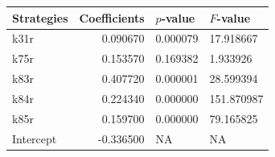 \begin{tabular}{lrll}
\toprule
Strategies & Coefficients & $p$-value & $F$-value \\
\midrule
k31r & 0.090670 & 0.000079 & 17.918667 \\
k75r & 0.153570 & 0.169382 & 1.933926 \\
k83r & 0.407720 & 0.000001 & 28.599394 \\
k84r & 0.224340 & 0.000000 & 151.870987 \\
k85r & 0.159700 & 0.000000 & 79.165825 \\
Intercept & -0.336500 & NA & NA \\
\bottomrule
\end{tabular}
